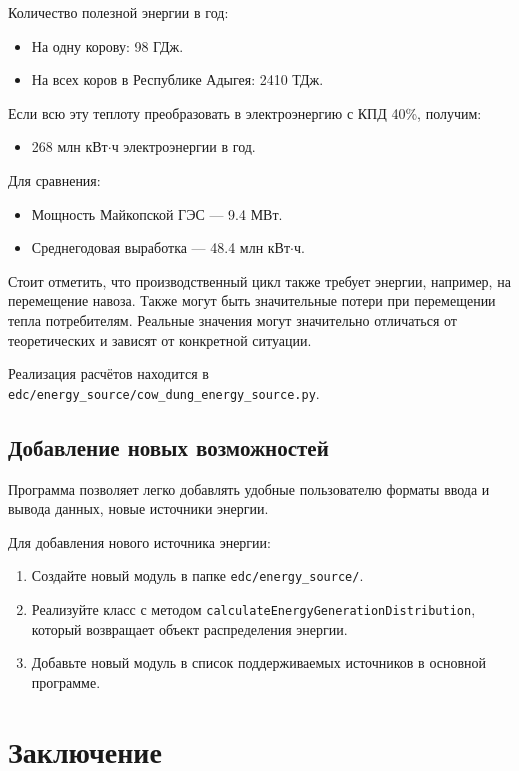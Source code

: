 \documentclass[12pt,a4paper]{scrartcl}
\begin{document}
Количество полезной энергии в год:
\begin{itemize}
  \item На одну корову: 98 ГДж.
  \item На всех коров в Республике Адыгея: 2410 ТДж.
\end{itemize}

Если всю эту теплоту преобразовать в электроэнергию с КПД 40\%, получим:
\begin{itemize}
  \item 268 млн кВт\(\cdot\)ч электроэнергии в год.
\end{itemize}

Для сравнения:
\begin{itemize}
  \item Мощность Майкопской ГЭС — 9.4 МВт.
  \item Среднегодовая выработка — 48.4 млн кВт\(\cdot\)ч.
\end{itemize}

Стоит отметить, что производственный цикл также требует энергии, например, на перемещение навоза. Также могут быть значительные потери при перемещении тепла потребителям. Реальные значения могут значительно отличаться от теоретических и зависят от конкретной ситуации.

Реализация расчётов находится в \texttt{edc/energy\_source/cow\_dung\_energy\_source.py}.

\subsection{Добавление новых возможностей}
\label{sec:desc:nop}

Программа позволяет легко добавлять удобные пользователю форматы ввода и вывода данных, новые источники энергии.

Для добавления нового источника энергии:
\begin{enumerate}
  \item Создайте новый модуль в папке \texttt{edc/energy\_source/}.
  \item Реализуйте класс с методом \texttt{calculateEnergyGenerationDistribution}, который возвращает объект распределения энергии.
  \item Добавьте новый модуль в список поддерживаемых источников в основной программе.
\end{enumerate}


\section{Заключение}
\label{sec:conclusion}
\end{document}
